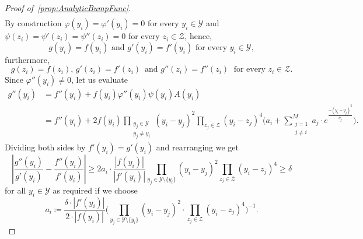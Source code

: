 \documentclass[12pt,]{article}
\def\cref#1{\ref{#1}}%
\theoremstyle{definition}
\theoremstyle{remark}
\newcommand{\0}{\mathbf{0}}
\begin{document}
{\begin{proof}[Proof of~\cref{prop:AnalyticBumpFunc}]
\begin{align*}
\end{align*}
By construction $\varphi(y_i) = \varphi'(y_i) =0$ for every $ y_i\in\mathcal{Y}$ and $\psi(z_i) =
\psi'(z_i) = \psi''(z_i)=0$ for every $z_i\in\mathcal{Z}$, hence,
\begin{equation*}
	g(y_i)=f(y_i) \text{ and } g'(y_i)=f'(y_i) \text{ for every } y_i\in\mathcal{Y},
\end{equation*}
furthermore,
\begin{equation*}
	g(z_i)=f(z_i),\, g'(z_i)=f'(z_i) \,\text{ and } g''(z_i)=f''(z_i) \;\text{ for every } z_i\in\mathcal{Z}.
\end{equation*}
Since $\varphi''(y_i)\neq 0$, let us evaluate
\begin{align*}
	g''(y_i) &= f''(y_i) + f(y_i)\varphi''(y_i)\psi(y_i)A(y_i) \\
	&=  f''(y_i) + 2f(y_i) \prod_{\substack{y_j\in\mathcal{Y}\\ y_j\neq y_i}} (y_i-y_j)^2
	\prod_{z_j\in\mathcal{Z}} (y_i-z_j)^4 \bigg( a_i+ \sum_{\substack{j=1 \\ j\neq i}}^{M}
	a_j\cdot e^{\frac{-(y_i-y_j)^2}{\eta_j}} \bigg).
\end{align*}
Dividing both sides by $f'(y_i)=g'(y_i)$ and rearranging we get
\begin{equation*}
	\left| \frac{g''(y_i)}{g'(y_i)} - \frac{f''(y_i)}{f'(y_i)} \right|\geq 2a_i\cdot
	\frac{|f(y_i)|}{|f'(y_i)|}\prod_{y_j\in\mathcal{Y}\setminus\{y_i\}} (y_i-y_j)^2
	\prod_{z_j\in\mathcal{Z}} (y_i-z_j)^4 \geq \delta
\end{equation*}
for all $y_i\in\mathcal{Y}$ as required if we choose
\begin{equation}\label{eq:a_iChoice}
	a_i \coloneqq \frac{\delta \cdot |f'(y_i)|}{2  \cdot |f(y_i)|}
	\Big(\prod_{y_j\in\mathcal{Y}\setminus\{y_i\}} (y_i - y_j)^2 \cdot \prod_{z_j\in\mathcal{Z}}
	(y_i - z_j)^4 \Big)^{-1}.
\end{equation}


\end{proof}}
\end{document}
